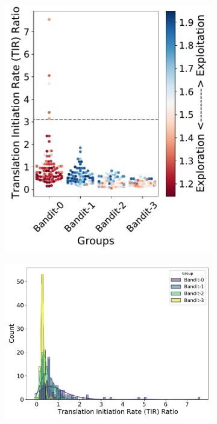 \documentclass{scrartcl}[2013/05/29]%
\begin{document}
\begin{figure}[!ht]
\begin{subfigure}[b]{0.25\textwidth}
    \end{subfigure}
    \begin{subfigure}[b]{0.25\textwidth}
        \centering
        \caption{}
        \includegraphics[scale=0.35]{plots/Supplementary/swarmplot_proj_salis.pdf}
    \end{subfigure}
    \begin{subfigure}[b]{0.48\textwidth}
        \centering
        \caption{}
        \includegraphics[scale=0.4]{plots/Supplementary/histogram_salis.pdf}

\end{subfigure}
\end{figure}
\end{document}
